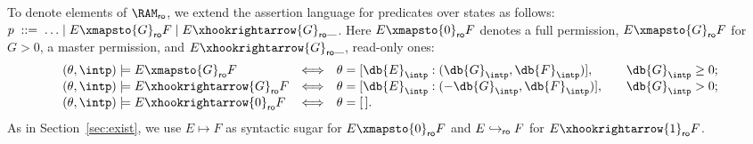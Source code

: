 To denote elements of $\RAM_{\sf ro}$, we extend the assertion language for
predicates over states as follows:
$
p \;::= \; \ldots \mid E \xmapsto{G}_{\sf ro} F \mid E \xhookrightarrow{G}_{\sf ro} \_ 
$. Here $E \xmapsto{0}_{\sf ro} F$ denotes a full permission, 
$E \xmapsto{G}_{\sf ro} F$ for $G>0$, a master permission, and 
$E \xhookrightarrow{G}_{\sf ro} \_ $, read-only ones:
$$
\begin{array}{lcl@{\qquad}l}
 (\theta, \intp) \models E \xmapsto{G}_{\sf ro} F &\Longleftrightarrow &\theta =
[\db{E}_{\intp} : (\db{G}_\intp, \db{F}_{\intp})],&\db{G}_\intp \ge 0;
\\ 
(\theta, \intp) \models E \xhookrightarrow{G}_{\sf ro} F 
&\Longleftrightarrow & 
\theta = [\db{E}_{\intp} : (-\db{G}_\intp, \db{F}_{\intp})],&\db{G}_\intp > 0;\\
(\theta, \intp) \models E \xhookrightarrow{0}_{\sf ro} F &\Longleftrightarrow
& \theta = [\,].
\end{array}
$$
As in Section~\ref{sec:exist}, we use $E \mapsto F$ as syntactic sugar for $E
\xmapsto{0}_{\sf ro} F$ and $E \hookrightarrow_{\sf ro} F$ for $E
\xhookrightarrow{1}_{\sf ro} F$.  


